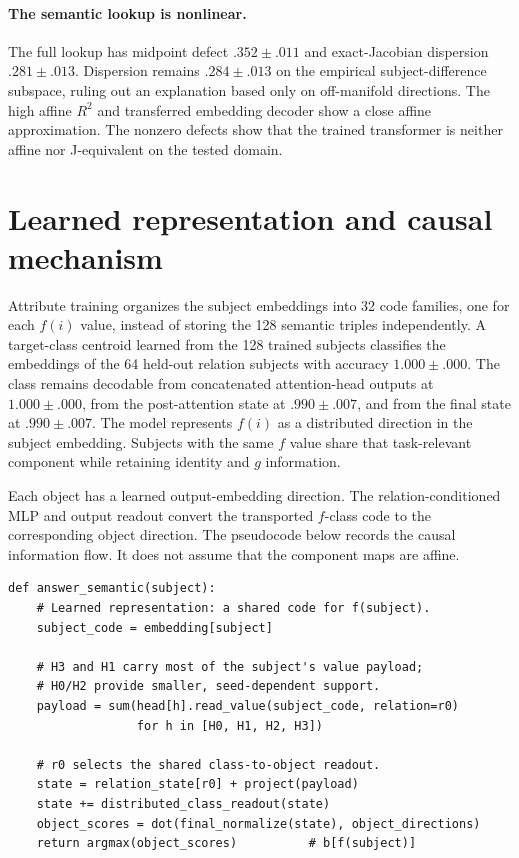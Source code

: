 \documentclass[11pt]{article}
\begin{document}
\paragraph{The semantic lookup is nonlinear.}
The full lookup has midpoint defect $.352\pm.011$ and exact-Jacobian dispersion
$.281\pm.013$.  Dispersion remains $.284\pm.013$ on the empirical
subject-difference subspace, ruling out an explanation based only on off-manifold
directions.  The high affine $R^2$ and transferred embedding decoder show a close
affine approximation.  The nonzero defects show that the trained transformer is
neither affine nor J-equivalent on the tested domain.

\section{Learned representation and causal mechanism}

Attribute training organizes the subject embeddings into 32 code families, one
for each $f(i)$ value, instead of storing the 128 semantic triples independently.
A target-class centroid learned from the 128 trained subjects classifies the
embeddings of the 64 held-out relation subjects with accuracy $1.000\pm.000$.
The class remains decodable from concatenated attention-head outputs at
$1.000\pm.000$, from the post-attention state at $.990\pm.007$, and from the final
state at $.990\pm.007$.  The model represents $f(i)$ as a distributed direction in
the subject embedding.  Subjects with the same $f$ value share that task-relevant
component while retaining identity and $g$ information.

Each object has a learned output-embedding direction.  The relation-conditioned
MLP and output readout convert the transported $f$-class code to the corresponding
object direction.  The pseudocode below records the causal information flow.  It
does not assume that the component maps are affine.

\begin{small}
\begin{verbatim}
def answer_semantic(subject):
    # Learned representation: a shared code for f(subject).
    subject_code = embedding[subject]

    # H3 and H1 carry most of the subject's value payload;
    # H0/H2 provide smaller, seed-dependent support.
    payload = sum(head[h].read_value(subject_code, relation=r0)
                  for h in [H0, H1, H2, H3])

    # r0 selects the shared class-to-object readout.
    state = relation_state[r0] + project(payload)
    state += distributed_class_readout(state)
    object_scores = dot(final_normalize(state), object_directions)
    return argmax(object_scores)          # b[f(subject)]
\end{verbatim}
\end{small}
\end{document}

